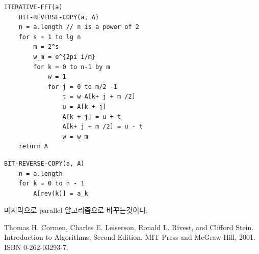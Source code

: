\begin{lstlisting}[style = CStyle]
ITERATIVE-FFT(a)
    BIT-REVERSE-COPY(a, A)
    n = a.length // n is a power of 2
    for s = 1 to lg n
        m = 2^s
        w_m = e^{2pi i/m}
        for k = 0 to n-1 by m
            w = 1
            for j = 0 to m/2 -1
                t = w A[k+ j + m /2]
                u = A[k + j]
                A[k + j] = u + t
                A[k+ j + m /2] = u - t
                w = w_m
    return A
\end{lstlisting}

\begin{lstlisting}[style = CStyle]
BIT-REVERSE-COPY(a, A)
    n = a.length
    for k = 0 to n - 1
        A[rev(k)] = a_k
\end{lstlisting}


마지막으로 parallel 알고리즘으로 바꾸는것이다.


\begin{thebibliography}{}
    Thomas H. Cormen, Charles E. Leiserson, Ronald L. Rivest, and Clifford Stein. Introduction to Algorithms, Second Edition. MIT Press and McGraw-Hill, 2001. ISBN 0-262-03293-7.
\end{thebibliography}